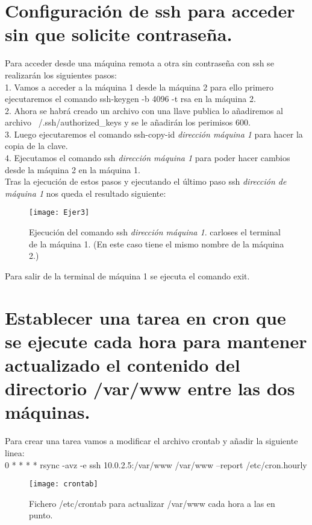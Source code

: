 
\section{ Configuración de ssh para acceder sin que solicite contraseña. }
  Para acceder desde una máquina remota a otra sin contraseña con ssh se realizarán los siguientes pasos:\\
  1. Vamos a acceder a la máquina 1 desde la máquina 2 para ello primero ejecutaremos el comando ssh-keygen  -b 4096 -t rsa en la máquina 2.\\
  2. Ahora se habrá creado un archivo con una llave publica lo añadiremos al archivo ~/.ssh/authorized\_keys y se le añadirán los perimisos 600.\\
  3. Luego ejecutaremos el comando ssh-copy-id \textit{dirección máquina 1} para hacer la copia de la clave.\\
  4. Ejecutamos el comando ssh \textit{dirección máquina 1} para poder hacer cambios desde la máquina 2 en la máquina 1.\\
  Tras la ejecución de estos pasos y ejecutando el último paso ssh \textit{dirección de máquina 1} nos queda el resultado siguiente:\\

  \begin{figure}[H]
		\centering
		\texttt{[image: Ejer3]}
		\caption{Ejecución del comando ssh \textit{dirección máquina 1}. carlos\@ubuntu es el terminal de la máquina 1. (En este caso tiene el mismo nombre de la máquina 2.)}
		\label{figura 5}
	\end{figure}

  Para salir de la terminal de máquina 1 se ejecuta el comando exit.\\

\section{ Establecer una tarea en cron que se ejecute cada hora para mantener actualizado el contenido del directorio /var/www entre las dos máquinas. }
  Para crear una tarea vamos a modificar el archivo crontab y añadir la siguiente linea:\\
  0 * * * * rsync -avz -e ssh 10.0.2.5:/var/www /var/www  --report  /etc/cron.hourly
  \begin{figure}[H]
		\centering
		\texttt{[image: crontab]}
		\caption{Fichero /etc/crontab para actualizar /var/www cada hora a las en punto.}
		\label{figura 6}
	\end{figure}




